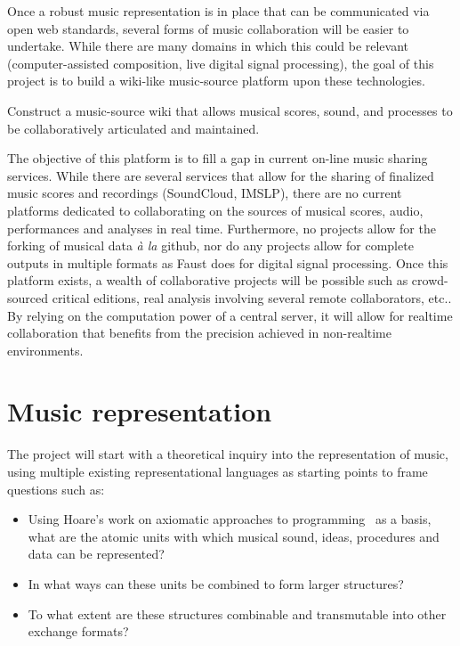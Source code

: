 \documentclass{article}
\begin{document}
Once a robust music representation is in place that can be communicated via
open web standards, several forms of music collaboration will be easier to
undertake. While there are many domains in which this could be relevant
(computer-assisted composition, live digital signal processing), the goal of
this project is to build a wiki-like music-source platform upon
these technologies.  
\begin{objective}
Construct a music-source wiki that allows musical scores, sound, and
processes to be collaboratively articulated and maintained.
\end{objective}
The objective of this platform is to fill a gap in
current on-line music sharing services. While there are several services
that allow for the sharing of finalized music scores and recordings (SoundCloud,
IMSLP), there are no current platforms dedicated to collaborating on
the sources of musical scores, audio, performances and analyses in real time.
Furthermore,
no projects allow for the forking of musical data \emph{\`a la} github, nor
do any projects allow for complete outputs in multiple formats as Faust does
for digital signal processing.  Once this platform exists, a wealth of
collaborative projects will be possible such as crowd-sourced critical
editions, real analysis involving several remote collaborators, etc.. By
relying on the computation power of a central server, it will allow for
realtime collaboration that benefits from the precision achieved in
non-realtime environments.
\section{Music representation}\label{sec:music-representation}
The project will start with a theoretical inquiry into the representation of
music, using multiple existing representational languages as starting points
to frame questions such as:
\begin{itemize}
\item Using Hoare's work on axiomatic approaches to
programming~\cite{hoare1969axiomatic} as a basis, what are the atomic units
with which musical sound, ideas, procedures and data can be represented?
\item In what ways can these units be combined to form
larger structures?
\item To what extent are these structures combinable and transmutable into
other exchange formats?
\end{itemize}
\end{document}
